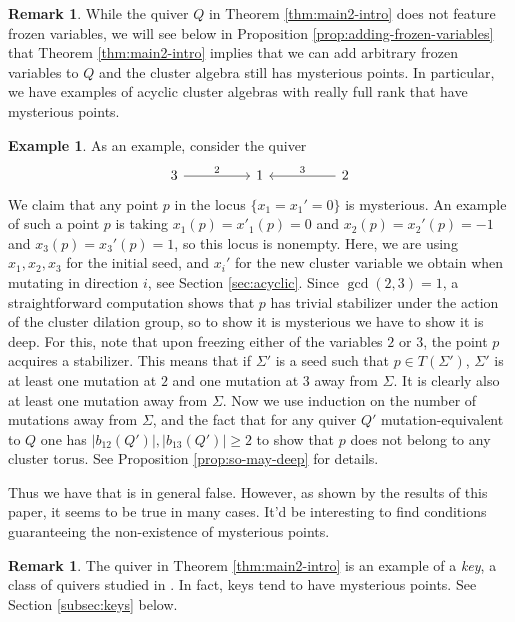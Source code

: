 \documentclass{amsart}
\newcommand{\seed}{\Sigma}
\numberwithin{equation}{section}
\theoremstyle{definition}
\newtheorem{remark}[theorem]{Remark}
\newtheorem{example}[theorem]{Example}
\begin{document}
\begin{remark}
    While the quiver $Q$ in Theorem \ref{thm:main2-intro} does not feature frozen variables, we will see below in Proposition \ref{prop:adding-frozen-variables} that Theorem \ref{thm:main2-intro} implies that we can add arbitrary frozen variables to $Q$ and the cluster algebra still has mysterious points. In particular, we have examples of acyclic cluster algebras with really full rank that have mysterious points. 
\end{remark}

\begin{example}\label{ex:mysterious-point-intro}
As an example, consider the quiver 
\[\begin{tikzcd}
	3 && 1 && 2
	\arrow["2", from=1-1, to=1-3]
	\arrow["3"', from=1-5, to=1-3]
\end{tikzcd}\]
We claim that any point $p$ in the locus $\{x_1 = x_1' = 0\}$ is mysterious. An example of such a point $p$ is taking $x_1(p) = x'_1(p) = 0$ and $x_2(p) = x_2'(p) = -1$ and $x_3(p) = x_3'(p) = 1$, so this locus is nonempty. Here, we are using $x_1, x_2, x_3$ for the initial seed, and $x_i'$ for the new cluster variable we obtain when mutating in direction $i$, see Section \ref{sec:acyclic}. Since $\gcd(2,3) = 1$, a straightforward computation shows that $p$ has trivial stabilizer under the action of the cluster dilation group, so to show it is mysterious we have to show it is deep. For this, note that upon freezing either of the variables $2$ or $3$, the point $p$ acquires a stabilizer. This means that if $\seed'$ is a seed such that $p \in T(\seed')$, $\seed'$ is at least one mutation at $2$ and one mutation at $3$ away from $\seed$. It is clearly also at least one mutation away from $\seed$. Now we use induction on the number of mutations away from $\seed$, and the fact that for any quiver $Q'$ mutation-equivalent to $Q$ one has $|b_{12}(Q')|, |b_{13}(Q')| \geq 2$ to show that $p$ does not belong to any cluster torus. See Proposition \ref{prop:so-may-deep} for details.  
\end{example}

Thus we have that \cite[Conjecture 1.1]{deep} is in general false. However, as shown by the results of this paper, it seems to be true in many cases. It'd be interesting to find conditions guaranteeing the non-existence of mysterious points. 

\begin{remark}
    The quiver in Theorem \ref{thm:main2-intro} is an example of a \emph{key}, a class of quivers studied in \cite{Ervin}. In fact, keys tend to have mysterious points. See Section \ref{subsec:keys} below.
\end{remark}
\end{document}
